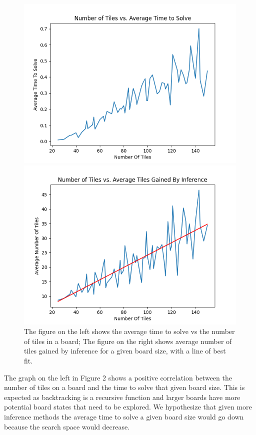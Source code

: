 \documentclass{article}
\theoremstyle{definition}
\begin{document}
\begin{figure}[H]
    \begin{minipage}{.49\textwidth}
        \centering
        \includegraphics[width=1\linewidth]{num_tiles_vs_avg_solve_time.png}
    \end{minipage}
    \begin{minipage}{.49\textwidth}
        \centering
        \includegraphics[width=1\linewidth]{num_tiles_vs_avg_tiles_from_inference.png}
    \end{minipage}
    \caption{The figure on the left shows the average time to solve vs the number of tiles in a board; The figure on the right shows average number of tiles gained by inference for a given board size, with a line of best fit.}
\end{figure}
The graph on the left in Figure 2 shows a positive correlation between the number of tiles on a board and the time to solve that given board size. This is expected as backtracking is a recursive function and larger boards have more potential board states that need to be explored. We hypothesize that given more inference methods the average time to solve a given board size would go down because the search space would decrease.
\end{document}
